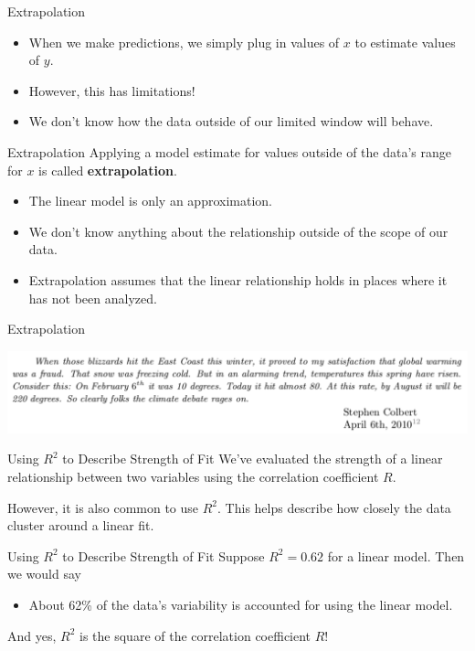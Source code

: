 \begin{frame}{Extrapolation}
    \begin{itemize}
        \item When we make predictions, we simply plug in values of $x$ to estimate values of $y$. 
        \item However, this has limitations!
        \item We don't know how the data outside of our limited window will behave.
    \end{itemize}
\end{frame}

\begin{frame}{Extrapolation}
    Applying a model estimate for values outside of the data's range for $x$ is called \textbf{extrapolation}.
    \begin{itemize}
        \item The linear model is only an approximation.
        \item We don't know anything about the relationship outside of the scope of our data.
        \item Extrapolation assumes that the linear relationship holds in places where it has not been analyzed.
    \end{itemize}
\end{frame}

\begin{frame}{Extrapolation}
    \begin{center}
        \includegraphics[scale=0.3]{images/colbert.png}
    \end{center}
\end{frame}

\begin{frame}{Using $R^2$ to Describe Strength of Fit}
    We've evaluated the strength of a linear relationship between two variables using the correlation coefficient $R$.
    
    \vspace{12pt}However, it is also common to use $R^2$. This helps describe how closely the data cluster around a linear fit.
\end{frame}

\begin{frame}{Using $R^2$ to Describe Strength of Fit}
    Suppose $R^2 = 0.62$ for a linear model. Then we would say
    \begin{itemize}
        \item About 62\% of the data's variability is accounted for using the linear model. 
    \end{itemize}
    And yes, $R^2$ is the square of the correlation coefficient $R$!
\end{frame}

